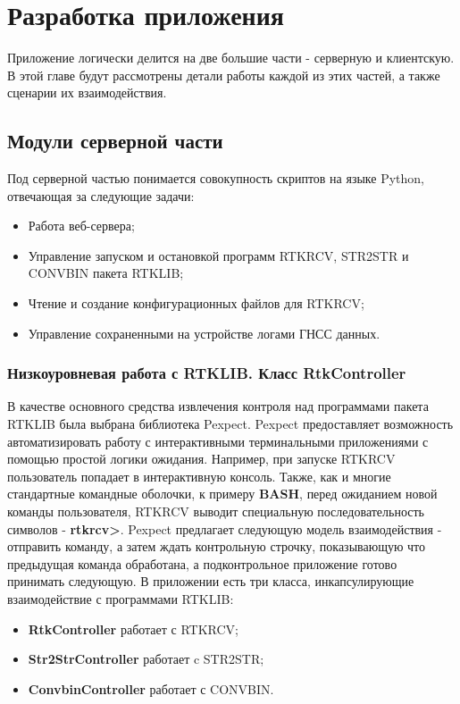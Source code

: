 \chapter{Разработка приложения} \label{chapt3}

Приложение логически делится на две большие части - серверную и клиентскую. В этой главе будут рассмотрены детали работы каждой из этих частей, а также сценарии их взаимодействия.

\section{Модули серверной части} \label{sect3_1}

Под серверной частью понимается совокупность скриптов на языке Python, отвечающая за следующие задачи:

\begin{itemize}
  \item Работа веб-сервера;
  \item Управление запуском и остановкой программ RTKRCV, STR2STR и CONVBIN пакета RTKLIB;
  \item Чтение и создание конфигурационных файлов для RTKRCV;
  \item Управление сохраненными на устройстве логами ГНСС данных.
\end{itemize}

\subsection{Низкоуровневая работа с RTKLIB. Класс RtkController} \label{subsect3_1_1}

В качестве основного средства извлечения контроля над программами пакета RTKLIB была выбрана библиотека Pexpect. Pexpect \cite{pexpect-docs} предоставляет возможность автоматизировать работу с интерактивными терминальными приложениями с помощью простой логики ожидания. Например, при запуске RTKRCV пользователь попадает в интерактивную консоль. Также, как и многие стандартные командные оболочки, к примеру \textbf{BASH}, перед ожиданием новой команды пользователя, RTKRCV выводит специальную последовательность символов - \textbf{rtkrcv>}. Pexpect предлагает следующую модель взаимодействия - отправить команду, а затем ждать контрольную строчку, показывающую что предыдущая команда обработана, а подконтрольное приложение готово принимать следующую. В приложении есть три класса, инкапсулирующие взаимодействие с программами RTKLIB:

\begin{itemize}
  \item \textbf{RtkController} работает с RTKRCV;
  \item \textbf{Str2StrController} работает c STR2STR;
  \item \textbf{ConvbinController} работает с CONVBIN.
\end{itemize}

